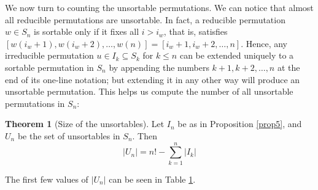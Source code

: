 \documentclass[final,nomarks]{dmtcs-episciences}
\theoremstyle{definition}
\newtheorem{thm}{Theorem}[section]
\theoremstyle{definition}
\theoremstyle{remark}
\newcommand{\card}[1]{\left| #1 \right|}
\begin{document}
We now turn to counting the unsortable permutations. We can notice that almost all reducible permutations are unsortable. In fact, a reducible permutation $w \in S_n$ is sortable only if it fixes all $i > i_w$, that is, satisfies $[w(i_w+1),w(i_w+2),\dots,w(n)] = [i_w+1,i_w+2,\dots,n]$.
Hence, any irreducible permutation $u \in I_k \subseteq S_k$ for $k \leq n$ can be extended uniquely to a sortable permutation in $S_n$ by appending the numbers $k+1, k+2, \ldots, n$ at the end of its one-line notation; but extending it in any other way will produce an unsortable permutation.
This helps us compute the number of all unsortable permutations in $S_n$:

\begin{thm}[Size of the unsortables]
    \label{cardUn}
    Let $ I_{n} $ be as in Proposition \ref{prop5}, and $ U_{n} $ be the set of unsortables in $ S_{n} $. Then
    \[
        \card{U_{n}} = n! - \sum_{k=1}^{n} \card{I_{k}}
    \]
\end{thm}
The first few values of $\card{U_n}$ can be seen in Table \hyperref[Un_1-12]{1}. 
\end{document}
